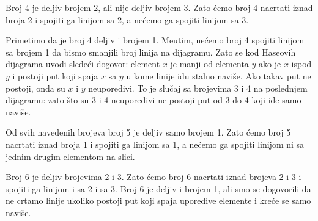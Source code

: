 \bigskip

\noindent
\begin{minipage}{3in}
  Broj 4 je deljiv brojem 2, ali nije deljiv brojem 3. Zato \'cemo broj 4 nacrtati iznad broja 2 i spojiti ga linijom sa 2, a ne\'cemo
  ga spojiti linijom sa 3.
\end{minipage}
\hfill
\begin{minipage}{2.5in}
  \begin{center}
    
  \end{center}
\end{minipage}

\medskip

Primetimo da je broj 4 deljiv i brojem 1. Me\dj utim, ne\'cemo broj 4 spojiti linijom sa brojem 1 da bismo smanjili broj linija na
dijagramu. Zato se kod Haseovih dijagrama uvodi slede\'ci dogovor: element $x$ je manji od elementa $y$ ako je $x$ ispod $y$ i postoji
put koji spaja $x$ sa $y$ u kome linije idu stalno navi\v se. Ako takav put ne postoji, onda su $x$ i $y$ neuporedivi.
To je slu\v caj sa brojevima 3 i 4 na poslednjem dijagramu: zato \v sto su 3 i 4 neuporedivi ne postoji put od 3 do 4 koji ide
samo navi\v se.

\bigskip

\noindent
\begin{minipage}{3in}
  Od svih navedenih brojeva broj 5 je deljiv samo brojem 1. Zato \'cemo broj 5 nacrtati iznad broja 1 i spojiti ga linijom sa 1, a ne\'cemo
  ga spojiti linijom ni sa jednim drugim elementom na slici.
\end{minipage}
\hfill
\begin{minipage}{2.5in}
  \begin{center}
    
  \end{center}
\end{minipage}

\bigskip

\noindent
\begin{minipage}{3in}
  Broj 6 je deljiv brojevima 2 i 3. Zato \'cemo broj 6 nacrtati iznad brojeva 2 i 3 i spojiti ga linijom i sa 2 i sa 3.
  Broj 6 je deljiv i brojem 1, ali smo se dogovorili da ne crtamo linije ukoliko postoji put koji spaja uporedive elemente i kre\'ce
  se samo navi\v se.
\end{minipage}
\hfill
\begin{minipage}{2.5in}
  \begin{center}
    
  \end{center}
\end{minipage}

